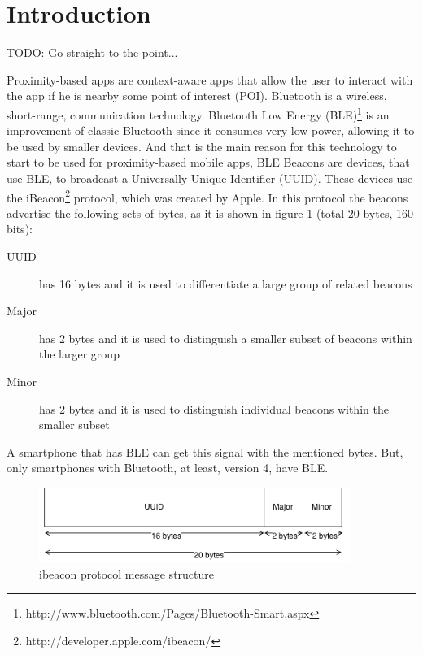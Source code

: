 
\section{Introduction}
\label{sec:introduction}
TODO: Go straight to the point...

Proximity-based apps are
context-aware apps that allow the user to interact
with the app if he is nearby some point of interest (POI).
Bluetooth is a wireless, short-range, communication technology.
Bluetooth Low Energy (BLE)\footnote{http://www.bluetooth.com/Pages/Bluetooth-Smart.aspx}
is an improvement of classic Bluetooth since it consumes
very low power, allowing it to be used by smaller devices.
And that is the main reason for this technology to start to
be used for proximity-based mobile apps,
BLE Beacons are devices, that use BLE, to broadcast a
Universally Unique Identifier (UUID).
These devices use the
iBeacon\footnote{http://developer.apple.com/ibeacon/}
protocol, which was created
by Apple\texttrademark. In this protocol the beacons
advertise the following sets of bytes, as it is shown in
figure \ref{fig:ibeacon}
(total 20 bytes, 160 bits):
\begin{description}
  \item[UUID] has 16 bytes and it is used to differentiate a
  large group of related beacons
  \item[Major] has 2 bytes and it is used to distinguish a smaller
  subset of beacons within the larger group
  \item[Minor] has 2 bytes and it is used to distinguish individual
  beacons within the smaller subset
\end{description}
A smartphone that
has BLE can get this signal with the mentioned bytes.
But, only smartphones
with Bluetooth, at least, version 4, have BLE.

\begin{figure}[!ht]
  \centering
    \includegraphics[width=0.9\textwidth]{figures/ibeacon}
    \caption{ibeacon protocol message structure}
    \label{fig:ibeacon}
\end{figure}


